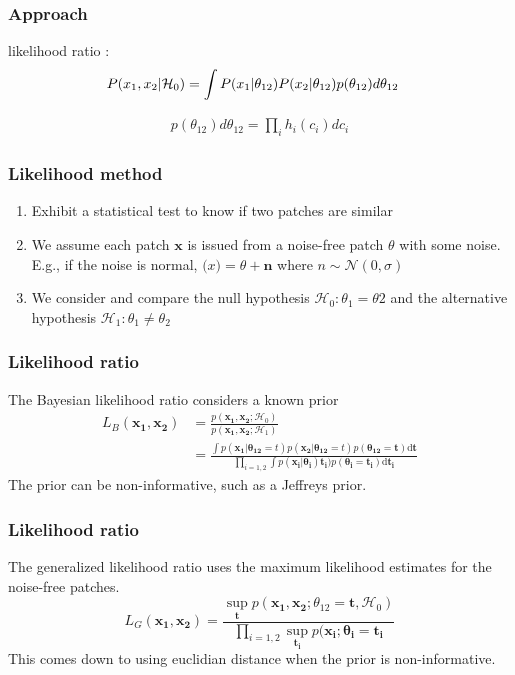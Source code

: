 \documentclass[compress]{beamer} %
\begin{document}
 \begin{frame}
  \frametitle{Approach}
  likelihood ratio :
  \[
  \begin{split}
   P(x_1,x_2 \arrowvert \mathcal{H}_0)&=\int P(x_1 \arrowvert \theta_{12}) P(x_2 \arrowvert \theta_{12}) p(\theta_{12}) d\theta_{12}
  \end{split}
  \]
  
  \[
  \begin{split}
   p(\theta_{12}) d\theta_{12}=\prod_i h_i(c_i)dc_i
  \end{split}
  \]
 \end{frame}
\begin{frame}
\frametitle{Likelihood method}
 \scriptsize
 {
 \begin{enumerate}
 \item Exhibit a statistical test to know if two patches are similar
 \item We assume each patch $\mathbf{x}$ is issued from a noise-free patch $\theta$ with some noise. E.g., if the noise is normal, $\mathbf(x) = \theta + \mathbf{n}$ where $n \sim \mathcal{N}(0,\sigma)$
 \item We consider and compare the null hypothesis $\mathcal{H}_0 : \theta_1=\theta2$ and the alternative hypothesis $\mathcal{H}_1 : \theta_1\neq\theta_2$
 \end{enumerate}
 }
\end{frame}
\begin{frame}
\frametitle{Likelihood ratio}
The Bayesian likelihood ratio considers a known prior
\begin{align*}
L_B(\mathbf{x_1},\mathbf{x_2})&=\frac{p(\mathbf{x_1},\mathbf{x_2};\mathcal{H}_0)}{p(\mathbf{x_1},\mathbf{x_2};\mathcal{H}_1)}\\
&=\frac{\int p(\mathbf{x_1}|\mathbf{\theta_{12}}=t)p(\mathbf{x_2}|\mathbf{\theta_{12}}=t)p(\mathbf{\theta_{12}}=\mathbf{t})\mathrm{d}\mathbf{t}}{\prod_{i=1,2}\int p(\mathbf{x_i}|\mathbf{\theta_i})\mathbf{t_i})p(\mathbf{\theta_i}=\mathbf{t_i})\mathrm{d}\mathbf{t_i}}
\end{align*}
The prior can be non-informative, such as a Jeffreys prior.
\end{frame}

\begin{frame}
\frametitle{Likelihood ratio}
The generalized likelihood ratio uses the maximum likelihood estimates for the noise-free patches.
\[
L_G(\mathbf{x_1},\mathbf{x_2})=\frac{\sup_\mathbf{t}p(\mathbf{x_1},\mathbf{x_2};\theta_{12}=\mathbf{t},\mathcal{H}_0)}{\prod_{i=1,2}\sup_\mathbf{t_i}p(\mathbf{x_i};\mathbf{\theta_i}=\mathbf{t_i}}
\]
This comes down to using euclidian distance when the prior is non-informative.
\end{frame}
\end{document}
